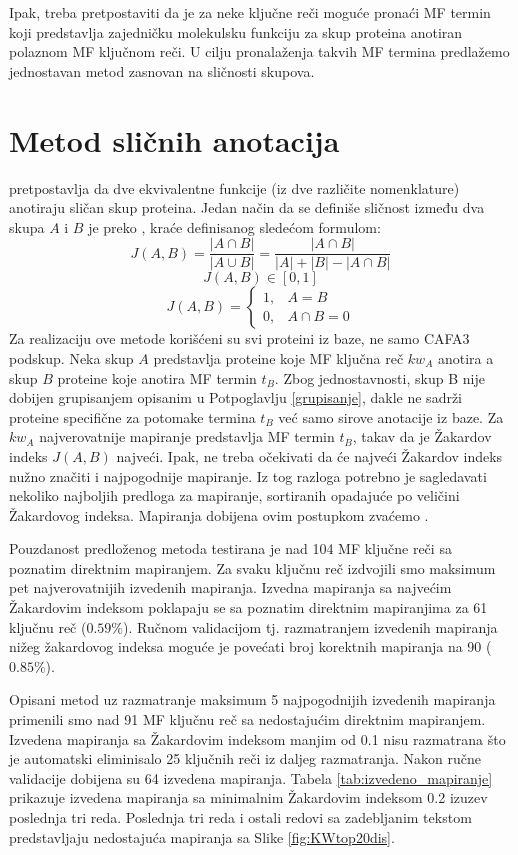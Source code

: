 Ipak, treba pretpostaviti da je za neke ključne reči moguće pronaći MF termin
koji predstavlja zajedničku molekulsku funkciju za skup proteina anotiran
polaznom MF ključnom reči.  U cilju pronalaženja takvih MF termina predlažemo
jednostavan metod zasnovan na sličnosti skupova.

\section{Metod sličnih anotacija}

 pretpostavlja da dve ekvivalentne funkcije (iz dve
različite nomenklature) anotiraju sličan skup proteina.  Jedan način da se
definiše sličnost između dva skupa $A$ i $B$ je preko 
, kraće   definisanog sledećom formulom:
$$J(A,B) = \dfrac{|A \cap B|}{|A \cup B|} =  \dfrac{|A \cap B|}{|A|+|B|-|A \cap B|}$$
$$  J(A,B) \in [0, 1] $$
\[   
  J(A,B) = 
    \begin{cases}
      1,&A=B  \\
      0,&A\cap B=0
    \end{cases}
\]
Za realizaciju ove metode korišćeni su svi proteini iz \swissprot baze, ne samo
CAFA3 podskup.  Neka skup $A$ predstavlja proteine koje MF ključna reč $kw_A$
anotira a skup $B$ proteine koje anotira MF termin $t_B$.  Zbog jednostavnosti,
skup B nije dobijen grupisanjem opisanim u Potpoglavlju \ref{grupisanje}, dakle ne sadrži proteine specifične za potomake termina $t_B$ već samo
sirove anotacije iz \swissprot baze.  Za $kw_A$ najverovatnije
mapiranje predstavlja MF termin $t_B$, takav da je Žakardov indeks $J(A,B)$
najveći. Ipak, ne treba očekivati da će najveći Žakardov indeks nužno značiti i
najpogodnije mapiranje. Iz tog razloga potrebno je  sagledavati nekoliko
najboljih predloga za mapiranje, sortiranih opadajuće po veličini Žakardovog
indeksa. Mapiranja dobijena ovim postupkom zvaćemo .

Pouzdanost predloženog metoda testirana je nad 104 MF ključne reči sa poznatim
direktnim mapiranjem.  Za svaku ključnu reč izdvojili smo maksimum pet
najverovatnijih izvedenih mapiranja. Izvedna mapiranja sa najvećim Žakardovim
indeksom poklapaju se sa poznatim direktnim mapiranjima za 61 ključnu reč
($0.59\%$). Ručnom validacijom tj. razmatranjem izvedenih mapiranja nižeg
žakardovog indeksa moguće je povećati broj korektnih mapiranja na 90
($0.85\%$).

Opisani metod uz razmatranje maksimum 5 najpogodnijih izvedenih mapiranja
primenili smo nad 91 MF ključnu reč sa nedostajućim direktnim mapiranjem.
Izvedena mapiranja sa Žakardovim indeksom manjim od 0.1 nisu razmatrana što je
automatski eliminisalo 25 ključnih reči iz daljeg razmatranja. Nakon ručne
validacije dobijena su 64 izvedena mapiranja.  Tabela
\ref{tab:izvedeno_mapiranje} prikazuje izvedena mapiranja sa minimalnim
Žakardovim indeksom 0.2 izuzev poslednja tri reda. Poslednja tri reda i
ostali redovi sa zadebljanim tekstom  predstavljaju nedostajuća
mapiranja sa Slike \ref{fig:KWtop20dis}.


